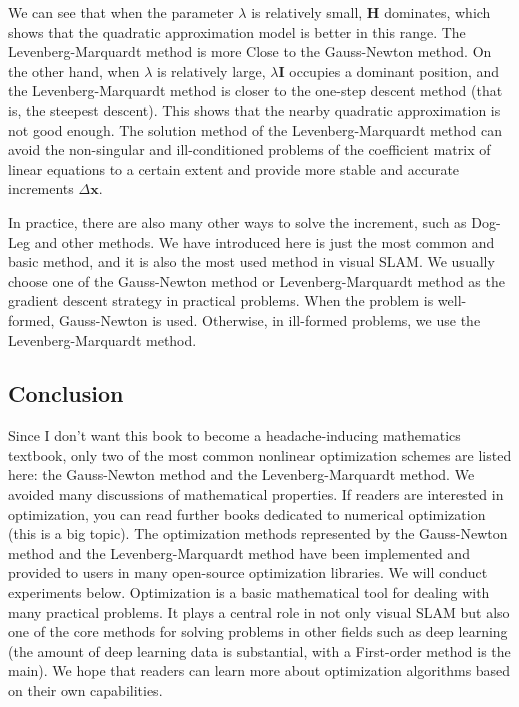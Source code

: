 We can see that when the parameter $\lambda$ is relatively small, $\mathbf{H}$ dominates, which shows that the quadratic approximation model is better in this range. The Levenberg-Marquardt method is more Close to the Gauss-Newton method. On the other hand, when $\lambda$ is relatively large, $\lambda \mathbf{I}$ occupies a dominant position, and the Levenberg-Marquardt method is closer to the one-step descent method (that is, the steepest descent). This shows that the nearby quadratic approximation is not good enough. The solution method of the Levenberg-Marquardt method can avoid the non-singular and ill-conditioned problems of the coefficient matrix of linear equations to a certain extent and provide more stable and accurate increments $\Delta \mathbf{x} $.

In practice, there are also many other ways to solve the increment, such as Dog-Leg \cite{Nocedal2006} and other methods. We have introduced here is just the most common and basic method, and it is also the most used method in visual SLAM. We usually choose one of the Gauss-Newton method or Levenberg-Marquardt method as the gradient descent strategy in practical problems. When the problem is well-formed, Gauss-Newton is used. Otherwise, in ill-formed problems, we use the Levenberg-Marquardt method.

\subsection{Conclusion}
Since I don't want this book to become a headache-inducing mathematics textbook, only two of the most common nonlinear optimization schemes are listed here: the Gauss-Newton method and the Levenberg-Marquardt method. We avoided many discussions of mathematical properties. If readers are interested in optimization, you can read further books dedicated to numerical optimization (this is a big topic)\cite{Nocedal2006}. The optimization methods represented by the Gauss-Newton method and the Levenberg-Marquardt method have been implemented and provided to users in many open-source optimization libraries. We will conduct experiments below. Optimization is a basic mathematical tool for dealing with many practical problems. It plays a central role in not only visual SLAM but also one of the core methods for solving problems in other fields such as deep learning (the amount of deep learning data is substantial, with a First-order method is the main). We hope that readers can learn more about optimization algorithms based on their own capabilities.

